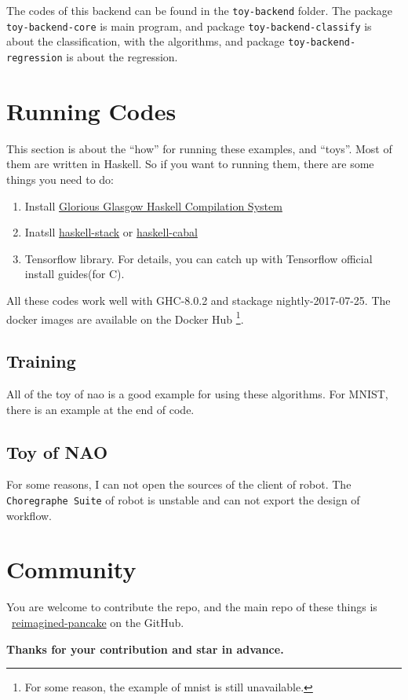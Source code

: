 \documentclass{article}
\begin{document}
\begin{appendix}
	The codes of this backend can be found in the \verb|toy-backend| folder.
	The package \verb|toy-backend-core| is main program, and package \verb|toy-backend-classify| is about the classification,
	with the algorithms, and package \verb|toy-backend-regression| is about the regression.
	
	\section{Running Codes}
	\label{apdx:run}
	
	This section is about the ``how'' for running these examples, and ``toys''.
	Most of them are written in Haskell. So if you want to running them, there are some things
	you need to do:
	\begin{enumerate}
		\item Install \href{https://www.haskell.org/ghc}{Glorious Glasgow Haskell Compilation System}
		\item Inatsll \href{https://www.haskellstack.org}{haskell-stack} or \href{https://www.haskell.org/cabal/}{haskell-cabal}
		\item Tensorflow library. For details, you can catch up with Tensorflow official install guides(for C).
	\end{enumerate}

	All these codes work well with GHC-8.0.2 and stackage nightly-2017-07-25.
	The docker images are available on the Docker Hub%
	\footnote{For some reason, the example of mnist is still unavailable.}.
	
	\subsection{Training}
	\label{run:tc}
	
	All of the toy of nao is a good example for using these algorithms.
	For MNIST, there is an example at the end of code.
	
	\subsection{Toy of NAO}
	\label{run:toy}
	
	For some reasons, I can not open the sources of the client of robot. The \verb|Choregraphe Suite| of robot is unstable and can not export the design of workflow.
	
	\section{Community}
	\label{aptx:commuity}
	
	You are welcome to contribute the repo, and the main repo of these things is
	\ \href{https://github.com/Qinka/reimagined-pancake}{reimagined-pancake} on the GitHub.
	
	\vspace*{1em}
	\begin{center}
	{\large \textbf{Thanks for your contribution and star in advance.}}
	\end{center}
	
	
	\printbibliography
	\tableofcontents
\end{appendix}
\end{document}
